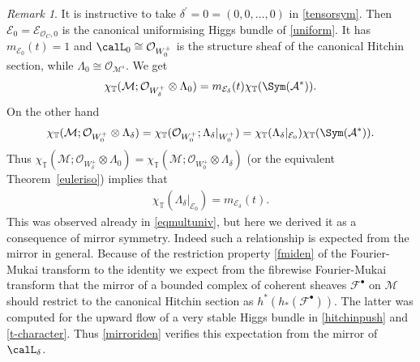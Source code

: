\documentclass[12pt]{article}
\numberwithin{equation}{section}
\theoremstyle{remark}
\newtheorem{remark}[theorem]{Remark}
\theoremstyle{definition}
\numberwithin{theorem}{section}
\def\beq{\begin{eqnarray}}
\def\eeq{\end{eqnarray}}
\def\calE{{\mathcal E}}
\def\M{{\mathcal{M}}}
\def\calA{{\mathcal{A}}}
\def\calF{{\mathcal{F}}}
\newcommand{\T}{{\mathbb{T}}}
\def\calO{{\mathcal O}}
\def\d{{{\delta}}}
\renewcommand{\1}{\mathbbm{1}}
\begin{document}
\begin{remark}  \label{mirrorate0}
	It is instructive to take $\delta^\prime=0=(0,0,\dots,0)$ in \eqref{tensorsym}. Then $\calE_{0}=\calE_{\calO_C,0}$ is the canonical uniformising Higgs bundle of  \eqref{uniform}. It has $m_{\calE_0}(t)=1$ and $\calL_{0}\cong \calO_{W^+_0}$ is the structure sheaf of the canonical Hitchin section, while $\Lambda_0\cong \calO_{\M^s}$.   We get $$\chi_\T(\M;\calO_{W_{\delta}^+}\otimes \Lambda_{0})= m_{\calE_{\d}}(t)\chi_\T(\Sym(\calA^*)).$$   On the other hand $$\chi_\T(\M;\calO_{W_0^+}\otimes \Lambda_{\d})=\chi_\T(\calO_{W_0^+};\Lambda_{\d}|_{W_0^+})=\chi_\T(\Lambda_{\d}|_{\calE_0})\chi_\T(\Sym(\calA^*)).$$ Thus $\chi_\T(\M;\calO_{W_{\delta}^+}\otimes \Lambda_{0})=\chi_\T(\M;\calO_{W_0^+}\otimes \Lambda_{\d})$ (or the equivalent Theorem~\ref{euleriso}) implies that \beq \label{mirroriden} \chi_\T(\Lambda_{\d}|_{\calE_0})=m_{\calE_{\d}}(t).\eeq This was observed already in \eqref{eqmultuniv}, but here we derived it as a consequence of mirror symmetry. Indeed such a relationship is expected from the mirror in general. Because  of the restriction property \eqref{fmiden} of the Fourier-Mukai transform to the identity we expect from the fibrewise Fourier-Mukai transform that the mirror of a bounded complex of coherent sheaves $\calF^\bullet$ on $\M$ should restrict to the canonical Hitchin section as $h^*(h_*(\calF^\bullet) )$. The latter was computed for the upward flow of a very stable Higgs bundle in \eqref{hitchinpush} and \eqref{t-character}. Thus \eqref{mirroriden} verifies this expectation from the mirror of $\calL_{\d}$. 
\end{remark}
\end{document}
